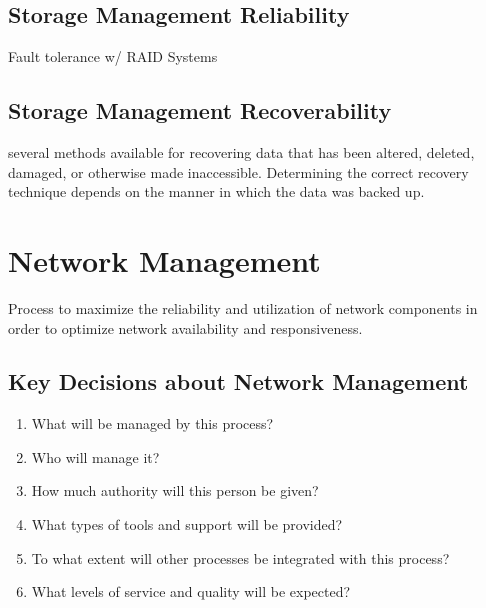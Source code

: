 \documentclass[8pt]{extarticle}
\newenvironment{Table}
   {\par\bigskip\noindent\minipage{\columnwidth}\centering}
   {\endminipage\par\bigskip}
\begin{document}
\begin{multicols}{3}
\subsection{Storage Management Reliability}
Fault tolerance w/ RAID Systems

\begin{Table}
\end{Table}

\subsection{Storage Management Recoverability}
several methods available for recovering data that has been altered, deleted, damaged, or otherwise made inaccessible.
Determining the correct recovery technique depends on the manner in which the data was backed up.

\section{Network Management}
Process to maximize the reliability and utilization of network components in order to optimize network availability 
and responsiveness.


\subsection{Key Decisions about Network Management}
\begin{enumerate}
\item What will be managed by this process?
\item Who will manage it?
\item How much authority will this person be given?
\item What types of tools and support will be provided?
\item To what extent will other processes be integrated with this process?
\item What levels of service and quality will be expected?
\end{enumerate}


\end{multicols}
\end{document}
